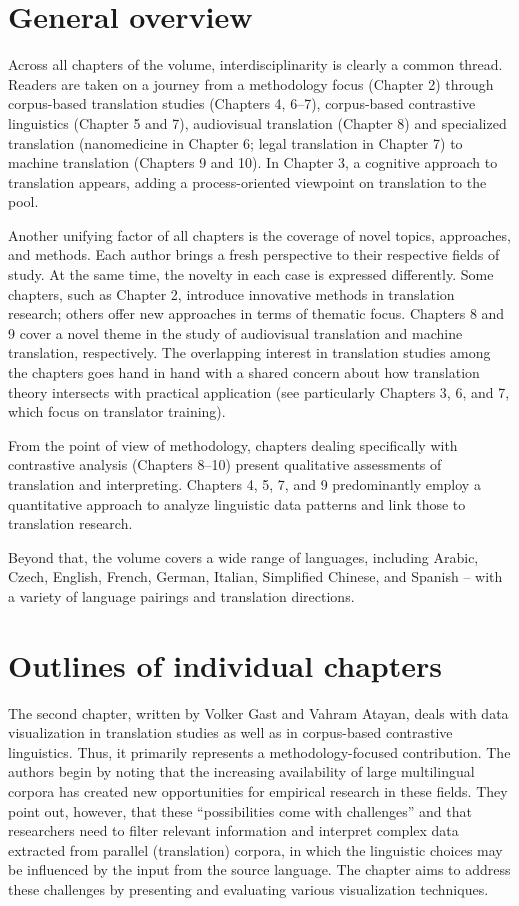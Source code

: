 \documentclass[output=paper]{langscibook}
\begin{document}
\section{General overview}

Across all chapters of the volume, interdisciplinarity is clearly a common thread. Readers are taken on a journey from a methodology focus (Chapter 2) through corpus-based translation studies (Chapters 4, 6–7), corpus-based contrastive linguistics (Chapter 5 and 7), audiovisual translation (Chapter 8) and specialized translation (nanomedicine in Chapter 6; legal translation in Chapter 7) to machine translation (Chapters 9 and 10). In Chapter 3, a cognitive approach to translation appears, adding a process-oriented viewpoint on translation to the pool.

Another unifying factor of all chapters is the coverage of novel topics, approaches, and methods. Each author brings a fresh perspective to their respective fields of study. At the same time, the novelty in each case is expressed differently. Some chapters, such as Chapter 2, introduce innovative methods in translation research; others offer new approaches in terms of thematic focus. Chapters 8 and 9 cover a novel theme in the study of audiovisual translation and machine translation, respectively. The overlapping interest in translation studies among the chapters goes hand in hand with a shared concern about how translation theory intersects with practical application (see particularly Chapters 3, 6, and 7, which focus on translator training).

From the point of view of methodology, chapters dealing specifically with contrastive analysis (Chapters 8–10) present qualitative assessments of translation and interpreting. Chapters 4, 5, 7, and 9 predominantly employ a quantitative approach to analyze linguistic data patterns and link those to translation research.

Beyond that, the volume covers a wide range of languages, including Arabic, Czech, English, French, German, Italian, Simplified Chinese, and Spanish – with a variety of language pairings and translation directions.

\section{Outlines of individual chapters}

The second chapter, written by Volker Gast and Vahram Atayan, deals with data visualization in translation studies as well as in corpus-based contrastive linguistics. Thus, it primarily represents a methodology-focused contribution. The authors begin by noting that the increasing availability of large multilingual corpora has created new opportunities for empirical research in these fields. They point out, however, that these “possibilities come with challenges” and that researchers need to filter relevant information and interpret complex data extracted from parallel (translation) corpora, in which the linguistic choices may be influenced by the input from the source language. The chapter aims to address these challenges by presenting and evaluating various visualization techniques.
\end{document}
